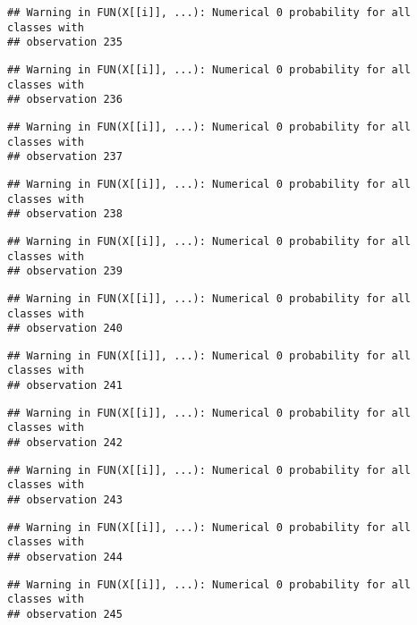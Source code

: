 \documentclass[
]{article}
\begin{document}
\begin{verbatim}
## Warning in FUN(X[[i]], ...): Numerical 0 probability for all classes with
## observation 235
\end{verbatim}

\begin{verbatim}
## Warning in FUN(X[[i]], ...): Numerical 0 probability for all classes with
## observation 236
\end{verbatim}

\begin{verbatim}
## Warning in FUN(X[[i]], ...): Numerical 0 probability for all classes with
## observation 237
\end{verbatim}

\begin{verbatim}
## Warning in FUN(X[[i]], ...): Numerical 0 probability for all classes with
## observation 238
\end{verbatim}

\begin{verbatim}
## Warning in FUN(X[[i]], ...): Numerical 0 probability for all classes with
## observation 239
\end{verbatim}

\begin{verbatim}
## Warning in FUN(X[[i]], ...): Numerical 0 probability for all classes with
## observation 240
\end{verbatim}

\begin{verbatim}
## Warning in FUN(X[[i]], ...): Numerical 0 probability for all classes with
## observation 241
\end{verbatim}

\begin{verbatim}
## Warning in FUN(X[[i]], ...): Numerical 0 probability for all classes with
## observation 242
\end{verbatim}

\begin{verbatim}
## Warning in FUN(X[[i]], ...): Numerical 0 probability for all classes with
## observation 243
\end{verbatim}

\begin{verbatim}
## Warning in FUN(X[[i]], ...): Numerical 0 probability for all classes with
## observation 244
\end{verbatim}

\begin{verbatim}
## Warning in FUN(X[[i]], ...): Numerical 0 probability for all classes with
## observation 245
\end{verbatim}
\end{document}
